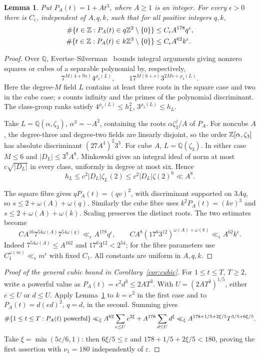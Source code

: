 \documentclass[11pt,reqno]{amsart}
\newtheorem{lemma}[theorem]{Lemma}
\theoremstyle{definition}
\theoremstyle{remark}
\numberwithin{equation}{section}
\newcommand{\Q}{\mathbb Q}\newcommand{\C}{\mathbb C}
\newcommand{\eps}{\varepsilon}\newcommand{\card}{\#}
\begin{document}
\begin{lemma}\label{lem:cubic-classical-fibres}
Put $P_A(t)=1+At^3$, where $A\ge1$ is an integer. For every $\epsilon>0$
there is $C_\epsilon$, independent of $A,q,k$, such that for all positive
integers $q,k$,
\[
 \begin{split}
 \card\{t\in\Z:P_A(t)\in q\Z^2\setminus\{0\}\}
   &\le C_\epsilon A^{178}q^\epsilon,\\
 \card\{t\in\Z:P_A(t)\in k\Z^3\setminus\{0\}\}
   &\le C_\epsilon A^{62}k^\epsilon.
 \end{split}
\]
\end{lemma}
\begin{proof}
Over $\Q$, Evertse--Silverman~\cite[Theorem~1]{es} bounds integral
arguments giving nonzero squares or cubes of a separable polynomial by,
respectively,
\[
 7^{M(4+9s)}4^{\rho_2(L)},\qquad
 17^{M(6+s)}3^{2Ms+\rho_3(L)}.
\]
Here the degree-$M$ field $L$ contains at least three roots in the square
case and two in the cube case; $s$ counts infinity and the primes of the
polynomial discriminant. The class-group ranks satisfy
$4^{\rho_2(L)}\le h_L^2$, $3^{\rho_3(L)}\le h_L$.

Take $L=\Q(\alpha,\zeta_3)$, $\alpha^3=-A^2$, containing the roots
$\alpha\zeta_3^j/A$ of $P_A$. For noncube $A$, the degree-three and
degree-two fields are linearly disjoint, so the order $\mathbb Z[\alpha,\zeta_3]$
has absolute discriminant $(27A^4)^2 3^3$. For cube $A$,
$L=\Q(\zeta_3)$. In either case $M\le6$ and $|D_L|\le3^9A^8$.
Minkowski gives an integral ideal of norm at most $c\sqrt{|D_L|}$
in every class, uniformly in degree at most six. Hence
\[
 h_L\le c^2|D_L|\zeta_L(2)\le c^2|D_L|\zeta(2)^6\ll A^8.
\]

The square fibre gives $qP_A(t)=(qv)^2$, with discriminant supported
on $3Aq$, so $s\le2+\omega(A)+\omega(q)$. Similarly the cube fibre
uses $k^2P_A(t)=(kv)^3$ and $s\le2+\omega(A)+\omega(k)$.
Scaling preserves the distinct roots. The two estimates become
\[
 CA^{16}7^{54\omega(A)}7^{54\omega(q)}
 \ll_\epsilon A^{178}q^\epsilon,\qquad
 CA^8(17^6 3^{12})^{\omega(A)+\omega(k)}
 \ll_\epsilon A^{62}k^\epsilon.
\]
Indeed $7^{54\omega(A)}\le A^{162}$ and $17^6 3^{12}<2^{54}$;
for the fibre parameters use $C_1^{\omega(m)}\ll_\epsilon m^\epsilon$
with fixed $C_1$. All constants are uniform in $A,q,k$.
\end{proof}

\begin{proof}[Proof of the general cubic bound in Corollary~\ref{cor:cubic}]
For $1\le t\le T$, $T\ge2$, write a powerful value as
$P_A(t)=e^2d^3\le2AT^3$. With $U=(2AT^3)^{1/5}$, either $e\le U$
or $d\le U$. Apply Lemma~\ref{lem:cubic-classical-fibres} to
$k=e^2$ in the first case and to $P_A(t)=d(ed)^2$, $q=d$, in the second.
Summing gives
\[
 \card\{1\le t\le T:P_A(t)\textnormal{ powerful}\}
 \ll_\xi A^{62}\sum_{e\le U}e^{2\xi}
       +A^{178}\sum_{d\le U}d^\xi
 \ll_\xi A^{178+1/5+2\xi/5}T^{3/5+6\xi/5}.
\]
Take $\xi=\min(5\eps/6,1)$: then $6\xi/5\le\eps$ and
$178+1/5+2\xi/5<180$, proving the first assertion with
$\nu_1=180$ independently of $\eps$.
\end{proof}
\end{document}
